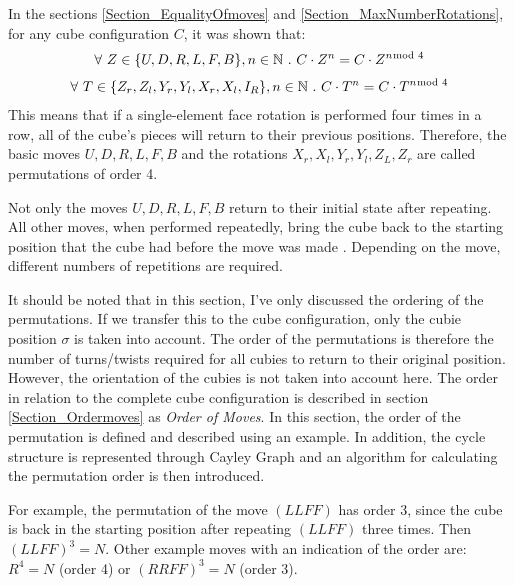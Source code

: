\label{Section_OrderPermutations}
In the sections \ref{Section_EqualityOfmoves} and \ref{Section_MaxNumberRotations}, for any cube configuration $C$, it was shown that:
\begin{align*}
\forall \ Z \in \{ U, D, R, L, F, B \}, n \in \mathbb{N} \ . \ C \cdot Z^n=C \cdot Z^{n \hspace*{-0.5em} \mod 4}
\end{align*}
\vspace*{-3em}
\begin{align*}
\forall \ T \in \{{Z_r}, {Z_l}, {Y_r}, {Y_l}, {X_r}, {X_l}, I_R \}, n \in \mathbb{N} \ . \ C \cdot T^n=C \cdot T^{n \hspace*{-0.5em} \mod 4}
\end{align*}
This means that if a single-element face rotation is performed four times in a row, all of the cube's pieces will return to their previous positions. Therefore, the basic moves $U, D, R, L, F, B$ and the rotations $X_r, X_l, Y_r, Y_l, Z_L, Z_r$ are called permutations of order 4.

Not only the moves $U, D, R, L, F, B$ return to their initial state after repeating. All other moves, when performed repeatedly, bring the cube back to the starting position that the cube had before the move was made \cite{TD}. Depending on the move, different numbers of repetitions are required.


It should be noted that in this section, I've only discussed the ordering of the permutations. If we transfer this to the cube configuration, only the cubie position $\sigma$ is taken into account. The order of the permutations is therefore the number of turns/twists required for all cubies to return to their original position. However, the orientation of the cubies is not taken into account here. The order in relation to the complete cube configuration is described in section \ref{Section_Ordermoves} as \textit{Order of Moves}. In this section, the order of the permutation is defined and described using an example. In addition, the cycle structure is represented through Cayley Graph and an algorithm for calculating the permutation order is then introduced.


\begin{example}

For example, the permutation of the move $(LLFF)$ has order 3, since the cube is back in the starting position after repeating $(LLFF)$ three times. Then $(LLFF)^3 = N$.
Other example moves with an indication of the order are: ${R^4= N}$ (order 4) or ${(RRFF)^3 = N}$ (order 3).
\end{example}


